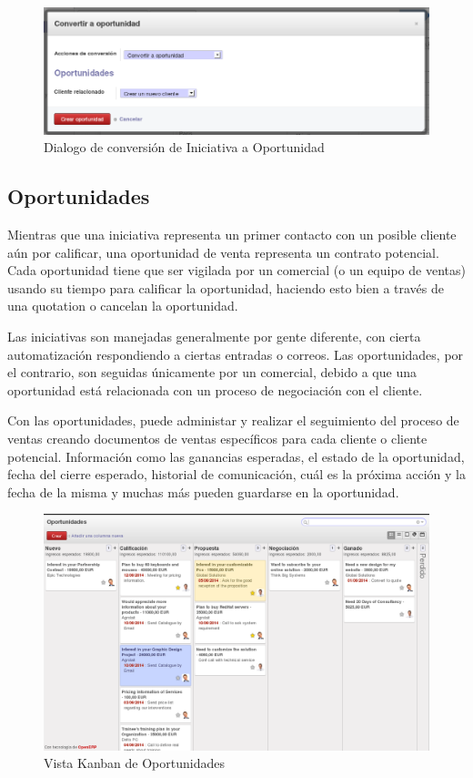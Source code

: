 \begin{figure}[H]
\includegraphics[width=\textwidth]{ventas/img/ven_iniaopo.png}
\caption{Dialogo de conversión de Iniciativa a Oportunidad}
\label{ven:iniaopo}
\end{figure}



\vspace{2cm}
\subsection{Oportunidades}
Mientras que una iniciativa representa un primer contacto con un posible cliente aún por calificar, una oportunidad de venta representa un contrato potencial. Cada oportunidad tiene que ser vigilada por un comercial (o un equipo de ventas) usando su tiempo para calificar la oportunidad, haciendo esto bien a través de una quotation o cancelan la oportunidad.

Las iniciativas son manejadas generalmente por gente diferente, con cierta automatización respondiendo a ciertas entradas o correos. Las oportunidades, por el contrario, son seguidas únicamente por un comercial, debido a que una oportunidad está relacionada con un proceso de negociación con el cliente.

Con las oportunidades, puede administar y realizar el seguimiento del proceso de ventas creando documentos de ventas específicos para cada cliente o cliente potencial. Información como las ganancias esperadas, el estado de la oportunidad, fecha del cierre esperado, historial de comunicación, cuál es la próxima acción y la fecha de la misma y muchas más pueden guardarse en la oportunidad.


\begin{figure}[H]
\includegraphics[width=\textwidth]{ventas/img/ven_oportunidades.png}
\caption{Vista Kanban de Oportunidades}
\label{ven:oportunidades}
\end{figure}


